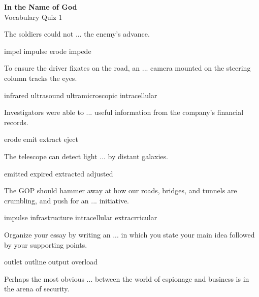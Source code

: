 \documentclass{exam}
\begin{document}
\begin{center}
\textbf{In the Name of God}\\ 
Vocabulary Quiz 1
\end{center}
\vspace{5mm}
\begin{questions}
\question The soldiers could not ... the enemy's advance.\\
\begin{oneparchoices}
 \choice impel
 \choice impulse
 \choice erode 
 \correctchoice impede
\end{oneparchoices}
\question To ensure the driver fixates on the road, an ... camera mounted on the steering column tracks the eyes.\\
\begin{oneparchoices}
 \correctchoice infrared 
 \choice ultrasound
 \choice ultramicroscopic 
 \choice intracellular
\end{oneparchoices}
\question Investigators were able to ... useful information from the company's financial records.\\
\begin{oneparchoices}
 \choice erode
 \choice emit
 \correctchoice extract
 \choice eject
\end{oneparchoices}
\question The telescope can detect light ... by distant galaxies.\\
\begin{oneparchoices}
 \correctchoice emitted
 \choice expired 
 \choice extracted
 \choice adjusted
\end{oneparchoices}
\question The GOP should hammer away at how our roads, bridges, and tunnels are crumbling, and push for an ... initiative.\\
\begin{oneparchoices}
\choice impulse 
 \correctchoice infrastructure
 \choice intracellular
 \choice extracrricular
\end{oneparchoices}
\question Organize your essay by writing an ... in which you state your main idea followed by your supporting points.\\
\begin{oneparchoices}
\choice outlet
 \correctchoice outline
 \choice output
 \choice overload 
\end{oneparchoices}
\question Perhaps the most obvious ... between the world of espionage and business is in the arena of security.\\

\end{questions}
\end{document}
